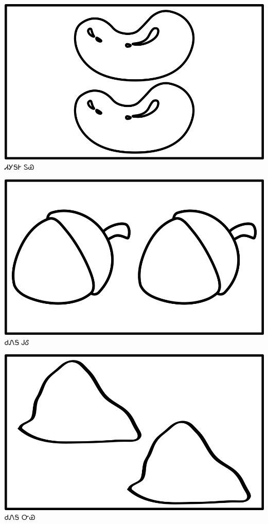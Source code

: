 \documentclass[avery5371]{flashcards}%
\begin{document}
    \begin{flashcard}{
        \includegraphics[width=0.95\columnwidth,height=.51\columnwidth,keepaspectratio]{../artwork/objects-neutral/tali-tuya}
    }
        \Huge ᏗᎩᎦᎨ ᏚᏯ
    \end{flashcard}

    \begin{flashcard}{
        \includegraphics[width=0.95\columnwidth,height=.51\columnwidth,keepaspectratio]{../artwork/objects-neutral/tali-gule}
    }
        \Huge ᏧᏁᎦ ᎫᎴ
    \end{flashcard}

    \begin{flashcard}{
        \includegraphics[width=0.95\columnwidth,height=.51\columnwidth,keepaspectratio]{../artwork/objects-neutral/tali-nvya}
    }
        \Huge ᏧᏁᎦ ᏅᏯ
    \end{flashcard}
\end{document}
